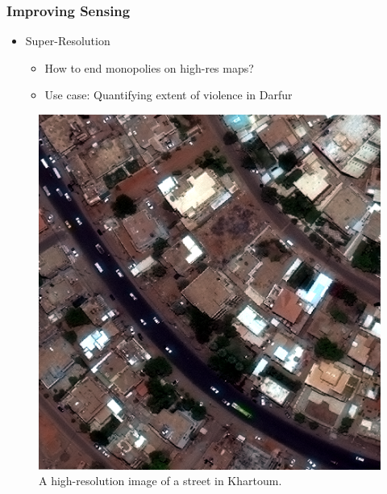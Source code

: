 \documentclass[10pt,mathserif]{beamer}
\begin{document}
\begin{frame}
  \frametitle{Improving Sensing}
  \begin{itemize}
  \item Super-Resolution
    \begin{itemize}
    \item How to end monopolies on high-res maps?
    \item Use case: Quantifying extent of violence in Darfur
    \end{itemize}
  \end{itemize} 
  \begin{figure}[ht]
    \centering
    \includegraphics[width=0.4\paperwidth]{figures/high_res_khartoum}
    \caption{A high-resolution image of a street in Khartoum. \label{fig:label} }
  \end{figure}
\end{frame}
\end{document}
